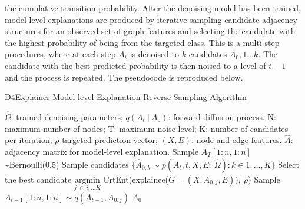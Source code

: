\documentclass[
  11pt,
  letterpaper,
]{article}
\begin{document}
the cumulative transition probability. After the denoising model has
been trained, model-level explanations are produced by iterative
sampling candidate adjacency structures for an observed set of graph
features and selecting the candidate with the highest probability of
being from the targeted class. This is a multi-step procedures, where at
each step \(A_t\) is denoised to \(k\) candidates \(A_0, 1 \dots k\).
The candidate with the best predicted probability is then noised to a
level of \(t-1\) and the process is repeated. The pseudocode is
reproduced below.

\begin{algorithm}
    \caption{D4Explainer Model-level Explanation Reverse Sampling Algorithm}\label{alg:cap}
    \begin{algorithmic}
        \Require $\hat \Omega$: trained denoising parameters; 
                $q(A_t \ | \ A_0)$: forward diffusion process.
        \renewcommand{\algorithmicrequire}{\textbf{Input:}}
        \renewcommand{\algorithmicensure}{\textbf{Output:}}
        \Require N: maximum number of nodes; T: maximum noise level; 
                K: number of candidates per iteration; 
                $\tilde{\rho}$ targeted prediction vector; 
                $(X, E)$: node and edge features.  
        \Ensure $\hat A$: adjacency matrix for model-level explanation.
        \State Sample $A_T[1:n, 1:n]$ \sim Bernoulli(0.5)
            \State Sample candidates 
                $\{\hat A_{0, k} \sim p(A_t,t, X, E; \ \hat \Omega) : k \in 1, \dots, K\}$
            \State Select the best candidate 
            $\underset{j \ \in \ i, \dots K}{\text{argmin}}$ 
            CrtEnt(explainee($G = (X, A_{0, j}, E)), \ \tilde{\rho}$)
            \State Sample $A_{t-1}[1:n, 1:n] \sim q(A_{t-1}, A_{0, j})$
        \EndFor
        \State \Return $A_0$
    \end{algorithmic}
    \end{algorithm}
\end{document}
